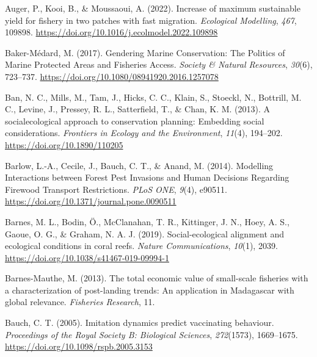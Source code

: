 \documentclass[
  12pt,
]{article}
\newlength{\cslhangindent}
\newlength{\cslentryspacingunit} %
\newenvironment{CSLReferences}[2] %
 {%
  \setlength{\parindent}{0pt}
  \ifodd #1
  \let\oldpar\par
  \def\par{\hangindent=\cslhangindent\oldpar}
  \fi
  \setlength{\parskip}{#2\cslentryspacingunit}
 }%
 {}
\begin{document}
\hypertarget{refs}{}
\begin{CSLReferences}{1}{2}
\leavevmode{}%
Auger, P., Kooi, B., \& Moussaoui, A. (2022). Increase of maximum sustainable yield for fishery in two patches with fast migration. \emph{Ecological Modelling}, \emph{467}, 109898. \url{https://doi.org/10.1016/j.ecolmodel.2022.109898}

\leavevmode{}%
Baker-Médard, M. (2017). Gendering {Marine Conservation}: {The Politics} of {Marine Protected Areas} and {Fisheries Access}. \emph{Society \& Natural Resources}, \emph{30}(6), 723--737. \url{https://doi.org/10.1080/08941920.2016.1257078}

\leavevmode{}%
Ban, N. C., Mills, M., Tam, J., Hicks, C. C., Klain, S., Stoeckl, N., Bottrill, M. C., Levine, J., Pressey, R. L., Satterfield, T., \& Chan, K. M. (2013). A social\textendash ecological approach to conservation planning: Embedding social considerations. \emph{Frontiers in Ecology and the Environment}, \emph{11}(4), 194--202. \url{https://doi.org/10.1890/110205}

\leavevmode{}%
Barlow, L.-A., Cecile, J., Bauch, C. T., \& Anand, M. (2014). Modelling {Interactions} between {Forest Pest Invasions} and {Human Decisions Regarding Firewood Transport Restrictions}. \emph{PLoS ONE}, \emph{9}(4), e90511. \url{https://doi.org/10.1371/journal.pone.0090511}

\leavevmode{}%
Barnes, M. L., Bodin, Ö., McClanahan, T. R., Kittinger, J. N., Hoey, A. S., Gaoue, O. G., \& Graham, N. A. J. (2019). Social-ecological alignment and ecological conditions in coral reefs. \emph{Nature Communications}, \emph{10}(1), 2039. \url{https://doi.org/10.1038/s41467-019-09994-1}

\leavevmode{}%
Barnes-Mauthe, M. (2013). The total economic value of small-scale fisheries with a characterization of post-landing trends: {An} application in {Madagascar} with global relevance. \emph{Fisheries Research}, 11.

\leavevmode{}%
Bauch, C. T. (2005). Imitation dynamics predict vaccinating behaviour. \emph{Proceedings of the Royal Society B: Biological Sciences}, \emph{272}(1573), 1669--1675. \url{https://doi.org/10.1098/rspb.2005.3153}


\end{CSLReferences}
\end{document}
